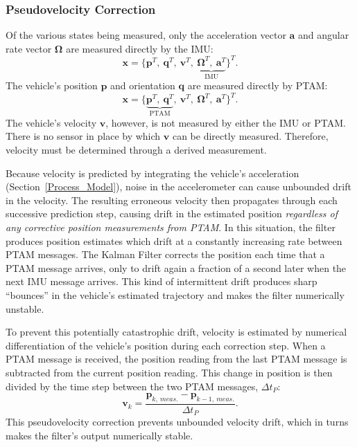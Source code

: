 \subsubsection{Pseudovelocity Correction}

Of the various states being measured, only the acceleration vector $\mathbf{a}$ and angular rate vector $\bm{\Omega}$ are measured directly by the IMU:
%
\begin{equation*}
\mathbf{x} = 
\Big\{   
    \mathbf{p}^{T},\
    \mathbf{q}^{T},\
    \mathbf{v}^{T},\
    \underbrace{
    \bm{\Omega}^{T},\
    \mathbf{a}^{T}}_{\text{IMU}}
\Big\} ^{T}.
\end{equation*}
%
The vehicle's position $\mathbf{p}$ and orientation $\mathbf{q}$ are measured directly by PTAM:
%
\begin{equation*}
\mathbf{x} = 
\Big\{
\underbrace{
    \mathbf{p}^{T},\
    \mathbf{q}^{T}}_{\text{PTAM}},\
    \mathbf{v}^{T},\
    \bm{\Omega}^{T},\
    \mathbf{a}^{T}
\Big\} ^{T}.
\end{equation*}
%
The vehicle's velocity $\mathbf{v}$, however, is not measured by either the IMU or PTAM. There is no sensor in place by which $\mathbf{v}$ can be directly measured. Therefore, velocity must be determined through a derived measurement.

Because velocity is predicted by integrating the vehicle's acceleration (Section~\ref{Process_Model}), noise in the accelerometer can cause unbounded drift in the velocity. The resulting erroneous velocity then propagates through each successive prediction step, causing drift in the estimated position \textit{regardless of any corrective position measurements from PTAM}. In this situation, the filter produces position estimates which drift at a constantly increasing rate between PTAM messages. The Kalman Filter corrects the position each time that a PTAM message arrives, only to drift again a fraction of a second later when the next IMU message arrives. This kind of intermittent drift produces sharp ``bounces'' in the vehicle's estimated trajectory and makes the filter numerically unstable.

To prevent this potentially catastrophic drift, velocity is estimated by numerical differentiation of the vehicle's position during each correction step. When a PTAM message is received, the position reading from the last PTAM message is subtracted from the current position reading. This change in position is then divided by the time step between the two PTAM messages, $\Delta t_{P}$:
%
\begin{equation}
\mathbf{v}_{k} = \frac{\mathbf{p}_{k,\ meas.} - \mathbf{p}_{k-1,\ meas.}}{\Delta t_{P}} .
\end{equation}
%
This pseudovelocity correction prevents unbounded velocity drift, which in turns makes the filter's output numerically stable.

